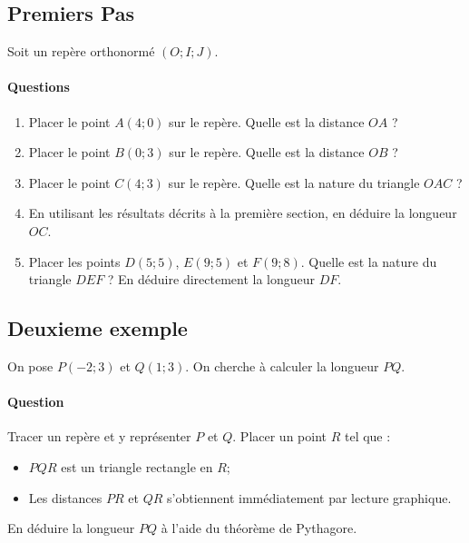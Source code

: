 \documentclass{article}
\begin{document}
\subsection*{Premiers Pas}
Soit un repère orthonormé $(O;I;J)$.
\begin{center}
\end{center}
\paragraph{Questions}
\begin{enumerate}[label=\emph{\alph*)}]
\item Placer le point $A(4;0)$ sur le repère. Quelle est la distance $OA$ ?
\item Placer le point $B(0;3)$ sur le repère. Quelle est la distance $OB$ ?
\item Placer le point $C(4;3)$ sur le repère. Quelle est la nature du triangle $OAC$ ?
\item En utilisant les résultats décrits à la première section, en déduire la longueur $OC$.
\item Placer les points $D(5;5)$, $E(9;5)$ et $F(9;8)$. Quelle est la nature du triangle $DEF$ ? En déduire directement la longueur $DF$.
\end{enumerate}
\subsection*{Deuxieme exemple}
On pose $P(-2;3)$ et $Q(1;3)$. On cherche à calculer la longueur $PQ$. 
\paragraph{Question} 
Tracer un repère et y représenter $P$ et $Q$. Placer un point $R$ tel que :
\begin{itemize}
\item $PQR$ est un triangle rectangle en $R$;
\item Les distances $PR$ et $QR$ s'obtiennent immédiatement par lecture graphique.
\end{itemize}
En déduire la longueur $PQ$ à l'aide du théorème de Pythagore.
\end{document}
